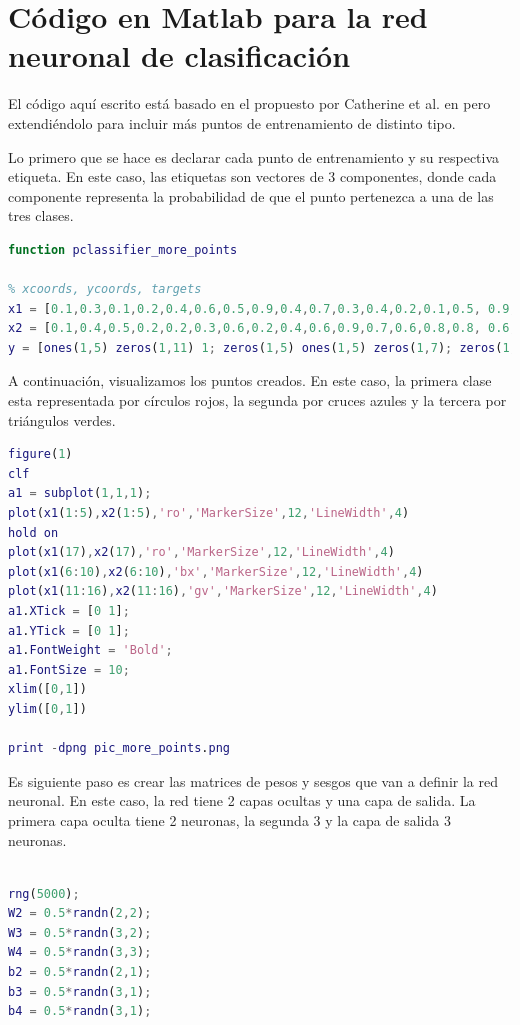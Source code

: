 \documentclass[a4paper,11pt,spanish, twoside, leqno]{tfg-uam}
\theoremstyle{definition}
\begin{document}
\appendix   
\chapter{Código en Matlab para la red neuronal de clasificación\label{sec:codigo_clasificacion}}

El código aquí escrito está basado en el propuesto por Catherine et al. en \cite{deeplearningSIAM} pero extendiéndolo para incluir más puntos de entrenamiento de distinto tipo.

Lo primero que se hace es declarar cada punto de entrenamiento y su respectiva etiqueta. En este caso, las etiquetas son vectores de 3 componentes, donde cada componente representa la probabilidad de que el punto pertenezca a una de las tres clases. 

\begin{lstlisting}[language=Matlab]
function pclassifier_more_points

% xcoords, ycoords, targets
x1 = [0.1,0.3,0.1,0.2,0.4,0.6,0.5,0.9,0.4,0.7,0.3,0.4,0.2,0.1,0.5, 0.9,0.8];
x2 = [0.1,0.4,0.5,0.2,0.2,0.3,0.6,0.2,0.4,0.6,0.9,0.7,0.6,0.8,0.8, 0.6,0.1];
y = [ones(1,5) zeros(1,11) 1; zeros(1,5) ones(1,5) zeros(1,7); zeros(1,10) ones(1,6) 0];
\end{lstlisting}

A continuación, visualizamos los puntos creados. En este caso, la primera clase esta representada por círculos rojos, la segunda por cruces azules y la tercera por triángulos verdes.

\begin{lstlisting}[language=Matlab]
figure(1)
clf
a1 = subplot(1,1,1);
plot(x1(1:5),x2(1:5),'ro','MarkerSize',12,'LineWidth',4)
hold on
plot(x1(17),x2(17),'ro','MarkerSize',12,'LineWidth',4)
plot(x1(6:10),x2(6:10),'bx','MarkerSize',12,'LineWidth',4)
plot(x1(11:16),x2(11:16),'gv','MarkerSize',12,'LineWidth',4)
a1.XTick = [0 1];
a1.YTick = [0 1];
a1.FontWeight = 'Bold';
a1.FontSize = 10;
xlim([0,1])
ylim([0,1])

print -dpng pic_more_points.png

\end{lstlisting}

Es siguiente paso es crear las matrices de pesos y sesgos que van a definir la red neuronal. En este caso, la red tiene 2 capas ocultas y una capa de salida. La primera capa oculta tiene 2 neuronas, la segunda 3 y la capa de salida 3 neuronas.

\begin{lstlisting}[language=Matlab]

rng(5000);
W2 = 0.5*randn(2,2);
W3 = 0.5*randn(3,2);
W4 = 0.5*randn(3,3);
b2 = 0.5*randn(2,1);
b3 = 0.5*randn(3,1);
b4 = 0.5*randn(3,1);

\end{lstlisting}
\end{document}
